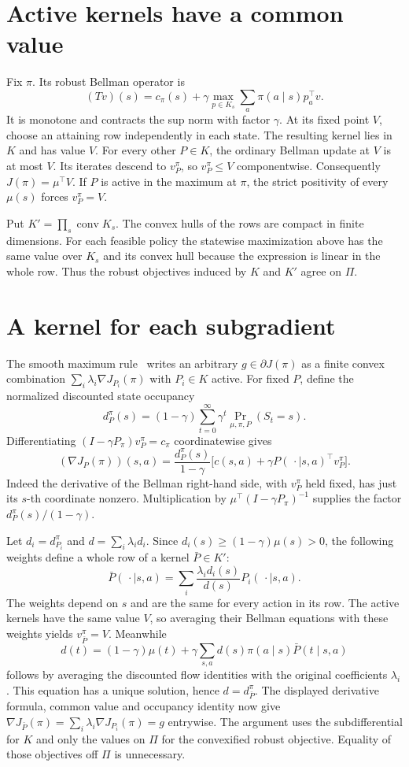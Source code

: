 \documentclass[11pt]{amsart}
\begin{document}
\section{Active kernels have a common value}
Fix \(\pi\). Its robust Bellman operator is
\[
 (Tv)(s)=c_\pi(s)+\gamma\max_{p\in K_s}\sum_{a}\pi(a\mid s)p_a^\top v.
\]
It is monotone and contracts the sup norm with factor \(\gamma\). At its fixed point \(V\), choose an attaining row independently in each state. The resulting kernel lies in \(K\) and has value \(V\). For every other \(P\in K\), the ordinary Bellman update at \(V\) is at most \(V\). Its iterates descend to \(v_P^\pi\), so \(v_P^\pi\leq V\) componentwise. Consequently \(J(\pi)=\mu^\top V\). If \(P\) is active in the maximum at \(\pi\), the strict positivity of every \(\mu(s)\) forces \(v_P^\pi=V\).

Put \(K'=\prod_s\operatorname{conv}K_s\). The convex hulls of the rows are compact in finite dimensions. For each feasible policy the statewise maximization above has the same value over \(K_s\) and its convex hull because the expression is linear in the whole row. Thus the robust objectives induced by \(K\) and \(K'\) agree on \(\Pi\).

\section{A kernel for each subgradient}
The smooth maximum rule~\cite[Lemma~2.1]{K} writes an arbitrary \(g\in\partial J(\pi)\) as a finite convex combination \(\sum_i\lambda_i\nabla J_{P_i}(\pi)\) with \(P_i\in K\) active. For fixed \(P\), define the normalized discounted state occupancy
\[
 d_P^\pi(s)=(1-\gamma)\sum_{t=0}^{\infty}\gamma^t
                     \Pr_{\mu,\pi,P}(S_t=s).
\]
Differentiating \((I-\gamma P_\pi)v_P^\pi=c_\pi\) coordinatewise gives
\[
 (\nabla J_P(\pi))(s,a)=\frac{d_P^\pi(s)}{1-\gamma}
                       \big[c(s,a)+\gamma P(\,\cdot\mid s,a)^\top v_P^\pi\big].
\]
Indeed the derivative of the Bellman right-hand side, with \(v_P^\pi\) held fixed, has just its \(s\)-th coordinate nonzero. Multiplication by \(\mu^\top(I-\gamma P_\pi)^{-1}\) supplies the factor \(d_P^\pi(s)/(1-\gamma)\).

Let \(d_i=d_{P_i}^\pi\) and \(d=\sum_i\lambda_i d_i\). Since \(d_i(s)\geq(1-\gamma)\mu(s)>0\), the following weights define a whole row of a kernel \(\bar P\in K'\):
\[
 \bar P(\,\cdot\mid s,a)=
 \sum_i\frac{\lambda_i d_i(s)}{d(s)}P_i(\,\cdot\mid s,a).
\]
The weights depend on \(s\) and are the same for every action in its row. The active kernels have the same value \(V\), so averaging their Bellman equations with these weights yields \(v_{\bar P}^\pi=V\). Meanwhile
\[
 d(t)=(1-\gamma)\mu(t)+\gamma\sum_{s,a}d(s)\pi(a\mid s)\bar P(t\mid s,a)
\]
follows by averaging the discounted flow identities with the original coefficients \(\lambda_i\). This equation has a unique solution, hence \(d=d_{\bar P}^\pi\). The displayed derivative formula, common value and occupancy identity now give
\(\nabla J_{\bar P}(\pi)=\sum_i\lambda_i\nabla J_{P_i}(\pi)=g\) entrywise. The argument uses the subdifferential for \(K\) and only the values on \(\Pi\) for the convexified robust objective. Equality of those objectives off \(\Pi\) is unnecessary.
\end{document}
